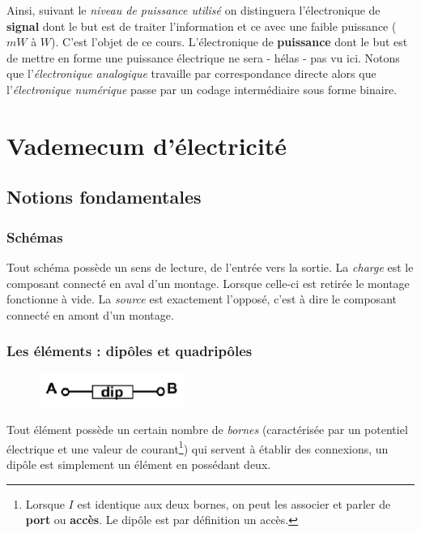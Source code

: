 \documentclass	[11pt, a4paper, openany]{book}
\begin{document}
Ainsi, suivant le \textit{niveau de puissance utilisé} on distinguera
l'électronique de \textbf{signal} dont le but est de traiter l'information et
ce avec une faible puissance ($mW$ à $W$). C'est l'objet de ce cours. L'électronique de \textbf{puissance} dont le but est de mettre en forme
une puissance électrique ne sera - hélas - pas vu ici. Notons que l'\textit{électronique analogique} travaille par correspondance directe alors que l'\textit{électronique numérique} passe par un codage intermédiaire sous forme binaire.

\newpage


\chapter{Vademecum d'électricité}
\section{Notions fondamentales}
\subsection{Schémas}
Tout schéma possède un sens de lecture, de l'entrée vers la sortie. La \textit{charge}
est le composant connecté en aval d'un montage. Lorsque celle-ci est retirée
le montage fonctionne à vide. La \textit{source} est exactement l'opposé,
c'est à dire le composant connecté en amont d'un montage.

\subsection{Les éléments : dipôles et quadripôles}
\begin{figure}
\includegraphics[scale=0.5]{img/image1.png}
\end{figure}
Tout élément possède un certain nombre de \textit{bornes} (caractérisée par un potentiel électrique et une valeur de courant\footnote{Lorsque $I$ est identique aux deux bornes, on peut les associer et parler de \textbf{port} ou \textbf{accès}. Le dipôle est par définition un accès.}) qui servent à établir des connexions, un dipôle est simplement un élément en possédant deux.
\end{document}

